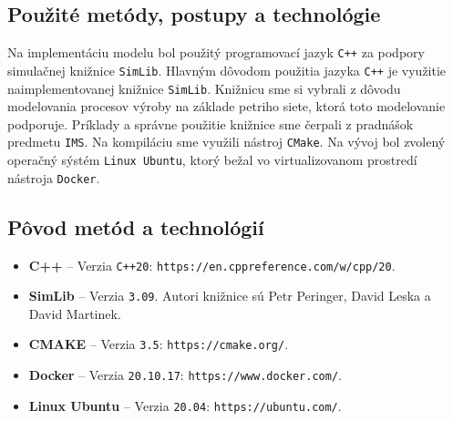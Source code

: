 \documentclass[a4paper, 10pt]{article}
\begin{document}
    \subsection{Použité metódy, postupy a technológie}
    Na implementáciu modelu bol použitý programovací jazyk \texttt{C++} za podpory simulačnej knižnice \texttt{SimLib}.
    Hlavným dôvodom použitia jazyka \texttt{C++} je využitie naimplementovanej
    knižnice \texttt{SimLib}. Knižnicu sme si vybrali z dôvodu modelovania procesov výroby na základe petriho siete, ktorá
    toto modelovanie podporuje. Príklady a správne použitie knižnice sme čerpali z pradnášok predmetu \texttt{IMS}\cite{IMS_slides}.
    Na kompiláciu sme využili nástroj \texttt{CMake}. Na vývoj bol zvolený operačný sýstém
    \texttt{Linux Ubuntu}, ktorý bežal vo virtualizovanom prostredí nástroja \texttt{Docker}.

    \subsection{Pôvod metód a technológií}
    \begin{itemize}
        \item \textbf{C++} -- Verzia \texttt{C++20}: \texttt{https://en.cppreference.com/w/cpp/20}.
        \item \textbf{SimLib} -- Verzia \texttt{3.09}\cite{simblib}. Autori knižnice sú Petr Peringer,
        David Leska a David Martinek.
        \item \textbf{CMAKE} -- Verzia \texttt{3.5}: \texttt{https://cmake.org/}.
        \item \textbf{Docker} -- Verzia \texttt{20.10.17}: \texttt{https://www.docker.com/}.
        \item \textbf{Linux Ubuntu} -- Verzia \texttt{20.04}: \texttt{https://ubuntu.com/}.
    \end{itemize}


\end{document}

